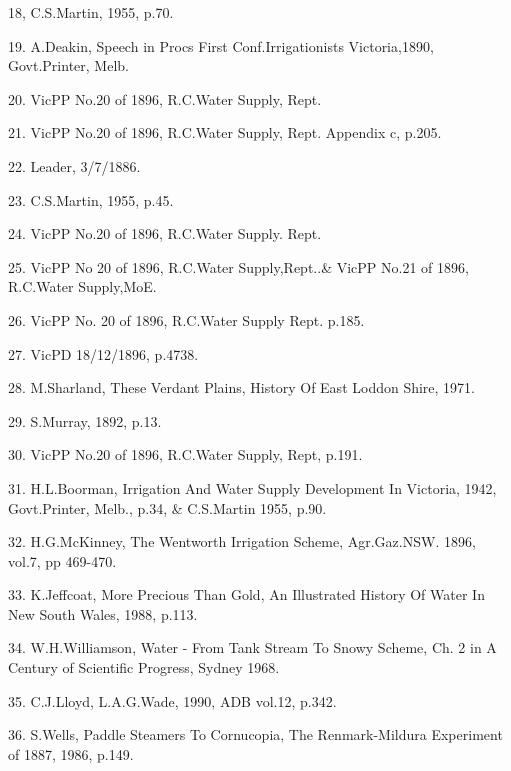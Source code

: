 18, C.S.Martin, 1955, p.70.

19. A.Deakin, Speech in Procs First Conf.Irrigationists Victoria,1890, 
      Govt.Printer, Melb.

20. VicPP No.20 of 1896, R.C.Water Supply, Rept.

21. VicPP No.20 of 1896, R.C.Water Supply, Rept. Appendix c, p.205.

22. Leader, 3/7/1886.

23. C.S.Martin, 1955, p.45.

24. VicPP No.20 of 1896, R.C.Water Supply. Rept.

25. VicPP No 20 of 1896, R.C.Water Supply,Rept..\& VicPP No.21 of
       1896, R.C.Water Supply,MoE.

26. VicPP No. 20 of 1896, R.C.Water Supply Rept. p.185.

27. VicPD 18/12/1896, p.4738.

28. M.Sharland, These Verdant Plains, History Of East Loddon Shire, 1971.

29. S.Murray, 1892, p.13.

30. VicPP No.20 of 1896, R.C.Water Supply, Rept, p.191.

31. H.L.Boorman, Irrigation And Water Supply Development In Victoria, 
       1942, Govt.Printer, Melb., p.34, \& C.S.Martin 1955, p.90.

32. H.G.McKinney, The Wentworth Irrigation Scheme, Agr.Gaz.NSW. 1896, 
      vol.7, pp 469-470.

33. K.Jeffcoat, More Precious Than Gold, An Illustrated History Of Water In   
      New South Wales, 1988, p.113.

34. W.H.Williamson, Water - From Tank Stream To Snowy Scheme, Ch. 2 in
      A Century of Scientific Progress, Sydney 1968.

35. C.J.Lloyd, L.A.G.Wade, 1990, ADB vol.12, p.342.

36. S.Wells, Paddle Steamers To Cornucopia, The Renmark-Mildura 
      Experiment of 1887, 1986, p.149.



